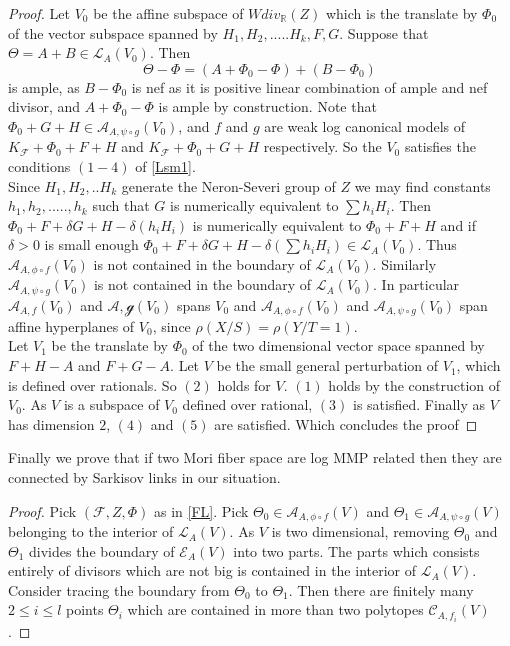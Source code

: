 \documentclass[12pt]{amsart}%
\theoremstyle{plain}
\theoremstyle{remark}
\theoremstyle{definition}
\newcommand{\<}{\leq}
\newcommand{\mbR}{\mathbb{R}}
\theoremstyle{definition}
\theoremstyle{definition}
\numberwithin{equation}{section}
\theoremstyle{remark}
\begin{document}
\begin{proof}
    Let $V_0$ be the affine subspace of $Wdiv_{\mbR}(Z)$ which is the translate by $\Phi_0$ of the vector subspace spanned by $H_1,H_2,.....H_k,F,G$. Suppose that $\Theta=A+B\in \mathcal{L}_A(V_0)$. Then \[
    \Theta-\Phi=(A+\Phi_0-\Phi)+(B-\Phi_0)
    \]
    is ample, as $B-\Phi_0$ is nef as it is positive linear combination of ample and nef divisor, and $A+\Phi_0-\Phi$ is ample by construction. Note that $\Phi_0+G+H\in \mathcal{A}_{A,\psi\circ g}(V_0)$, and $f$ and $g$ are weak log canonical models of $K_{\mathcal{F}}+\Phi_0+F+H$ and $K_{\mathcal{F}}+\Phi_0+G+H$ respectively.  So the $V_0$ satisfies the conditions $(1-4)$ of \ref{Lsm1}.\\
    Since $H_1,H_2,..H_k$ generate the Neron-Severi group of $Z$ we may find constants $h_1,h_2,.....,h_k$ such that $G$ is numerically equivalent to $\sum h_i H_i$. Then $\Phi_0+F+\delta G+H-\delta(h_i H_i)$ is numerically equivalent to $\Phi_0+F+H$ and if $\delta>0$ is small enough $\Phi_0+F+\delta G+H-\delta(\sum h_i H_i)\in \mathcal{L}_A(V_0)$. Thus $\mathcal{A}_{A,\phi\circ f}(V_0)$ is not contained in the boundary of $\mathcal{L}_A(V_0)$. Similarly $\mathcal{A}_{A,\psi\circ g}(V_0)$ is not contained in the boundary of $\mathcal{L}_A(V_0)$. In particular $\mathcal{A}_{A,f}(V_0)$ and $\mathcal{A,g}(V_0)$ spans $V_0$ and $\mathcal{A}_{A,\phi\circ f}(V_0)$ and $\mathcal{A}_{A,\psi\circ g}(V_0)$ span affine hyperplanes of $V_0$, since $\rho(X/S)=\rho(Y/T=1)$.\\
    Let $V_1$ be the translate by $\Phi_0$ of the two dimensional vector space spanned by $F+H-A$ and $F+G-A$. Let $V$ be the small general perturbation of $V_1$, which is defined over rationals. So $(2)$ holds for $V$. $(1)$ holds by the construction of $V_0$. As $V$ is a subspace of $V_0$ defined over rational, $(3)$ is satisfied. Finally as $V$ has dimension $2$, $(4)$ and $(5)$ are satisfied. Which concludes the proof
\end{proof}
Finally we prove that if two Mori fiber space are log MMP related then they are connected by Sarkisov links in our situation.
\begin{proof}
    Pick $(\mathcal{F},Z,\Phi)$ as in \ref{FL}. Pick $\Theta_0\in \mathcal{A}_{A,\phi\circ f}(V)$ and $\Theta_1\in \mathcal{A}_{A,\psi\circ g}(V)$ belonging to the interior of $\mathcal{L}_A(V)$. As $V$ is two dimensional, removing $\Theta_0$ and $\Theta_1$ divides the boundary of $\mathcal{E}_A(V)$ into two parts. The parts which consists entirely of divisors which are not big is contained in the interior of $\mathcal{L}_A(V)$. Consider tracing the boundary from $\Theta_0$ to $\Theta_1$. Then there are finitely many $2\leqslant i\leqslant l$ points $\Theta_i$ which are contained in more than two polytopes $\mathcal{C}_{A,f_i}(V)$.
\end{proof}
\end{document}
